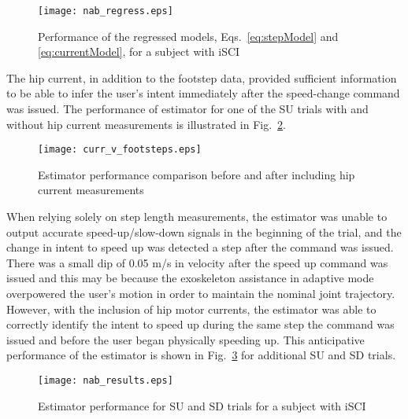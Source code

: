 \begin{figure}
	\centering
	\texttt{[image: nab\_regress.eps]}
	\vspace{-1em}
	\caption{Performance of the regressed models, Eqs.~\eqref{eq:stepModel} and \eqref{eq:currentModel}, for a subject with iSCI} \label{fig:nab_regressor}
\end{figure}


The hip current, in addition to the footstep data, provided sufficient information to be able to infer the user's intent immediately after the speed-change command was issued. The performance of estimator for one of the SU trials with and without hip current measurements is illustrated in Fig.~\ref{fig:c_v_f}. 

\begin{figure}
	\centering
	\texttt{[image: curr\_v\_footsteps.eps]}
	\vspace{-1em}
	\caption{Estimator performance comparison before and after including hip current measurements} \label{fig:c_v_f}
\end{figure}

When relying solely on step length measurements, the estimator was unable to output accurate speed-up/slow-down signals in the beginning of the trial, and the change in intent to speed up was detected a step after the command was issued. There was a small dip of 0.05 m/s in velocity after the speed up command was issued and this may be because the exoskeleton assistance in adaptive mode overpowered the user's motion in order to maintain the nominal joint trajectory. However, with the inclusion of hip motor currents, the estimator was able to correctly identify the intent to speed up during the same step the command was issued and before the user began physically speeding up. This anticipative performance of the estimator is shown in Fig.~\ref{fig:nab_results} for additional SU and SD trials.
 
\begin{figure}
	\centering
	\texttt{[image: nab\_results.eps]}
	\caption{Estimator performance for SU and SD trials for a subject with iSCI} \label{fig:nab_results}
	\vspace{-1em}
\end{figure}

